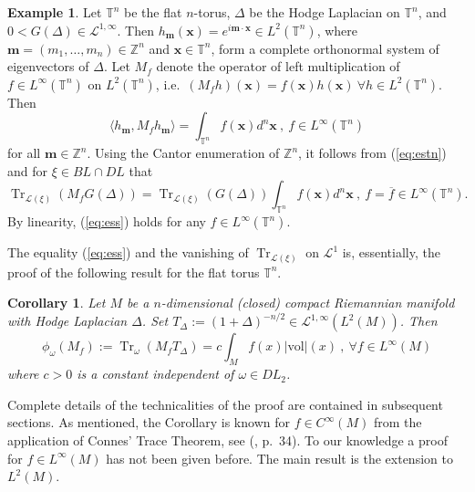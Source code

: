 \documentclass[final,1p]{elsarticle}
\numberwithin{equation}{section}
\theoremstyle{plain}
\newtheorem{cor}[thm]{Corollary}
\theoremstyle{definition}
\newtheorem{ex}[thm]{Example}
\begin{document}
\begin{ex} \label{ex:ess}
Let ${\ensuremath{\mathbb{T}}}^n$ be the flat $n$-torus, $\Delta$ be the Hodge Laplacian on ${\ensuremath{\mathbb{T}}}^n$, and $0 < G(\Delta) \in \mathcal{L}^{1,\infty}$.
Then $h_{\mathbf{m}}(\mathbf{x}) = e^{i \mathbf{m} \cdot \mathbf{x}} \in L^2({\ensuremath{\mathbb{T}}}^n)$,
where $\mathbf{m} = (m_1,\ldots,m_n) \in {\ensuremath{\mathbb{Z}}}^n$ and $\mathbf{x} \in {\ensuremath{\mathbb{T}}}^n$,
form a complete orthonormal system of eigenvectors of $\Delta$.
Let $M_f$ denote the operator of left multiplication of $f \in L^\infty({\ensuremath{\mathbb{T}}}^n)$ on $L^2({\ensuremath{\mathbb{T}}}^n)$, i.e.~$(M_fh)(\mathbf{x}) = f(\mathbf{x})h(\mathbf{x}) \ {\ensuremath{\forall}} h \in L^2({\ensuremath{\mathbb{T}}}^n)$.  Then
$$
{\ensuremath{\langle {h_{\mathbf{m}}} , {M_fh_{\mathbf{m}}} \rangle}} =
\int_{{\ensuremath{\mathbb{T}}}^n} f(\mathbf{x}) d^n\mathbf{x} \ , \ f \in L^\infty({\ensuremath{\mathbb{T}}}^n)
$$
for all $\mathbf{m} \in {\ensuremath{\mathbb{Z}}}^n$.  Using the Cantor enumeration of
${\ensuremath{\mathbb{Z}}}^n$, it follows from (\ref{eq:estn}) and for ${\ensuremath{\xi}} \in BL \cap DL$
that
\begin{equation} \label{eq:ess}
\operatorname{Tr}_{\mathcal{L}({\ensuremath{\xi}})}(M_fG(\Delta))
= \operatorname{Tr}_{\mathcal{L}({\ensuremath{\xi}})}(G(\Delta)) \int_{{\ensuremath{\mathbb{T}}}^n} f(\mathbf{x}) d^n\mathbf{x} \ , \ f=\overline{f} \in L^\infty({\ensuremath{\mathbb{T}}}^n) .
\end{equation}
By linearity, (\ref{eq:ess}) holds for any $f \in L^\infty({\ensuremath{\mathbb{T}}}^n)$.
\end{ex}

The equality (\ref{eq:ess}) and the vanishing of $\operatorname{Tr}_{\mathcal{L}({\ensuremath{\xi}})}$ on $\mathcal{L}^1$ is, essentially, the proof of the following result for the flat torus ${\ensuremath{\mathbb{T}}}^n$.

\begin{cor} \label{cor:result1}
Let $M$ be a $n$-dimensional (closed) compact Riemannian manifold with Hodge Laplacian $\Delta$. Set $T_\Delta := (1+\Delta)^{-n/2} \in \mathcal{L}^{1,\infty}(L^2(M))$.  Then 
$$
\phi_{\omega}(M_f) := \operatorname{Tr}_{\omega}(M_f T_\Delta) = c \int_{M} f(x) |\mathrm{vol}|(x) \ , \ {\ensuremath{\forall}} f \in L^\infty(M)
$$
where $c > 0$ is a constant independent of $\omega \in DL_2$.
\end{cor}

Complete details of the technicalities of the proof are contained in subsequent sections.  As mentioned, the Corollary is known
for $f \in C^\infty(M)$ from the application of Connes' Trace Theorem, see (\cite{FB}, p.~34). To our knowledge a proof for $f \in L^\infty(M)$ has not been given before. 
The main result is the extension to $L^2(M)$.
\end{document}
